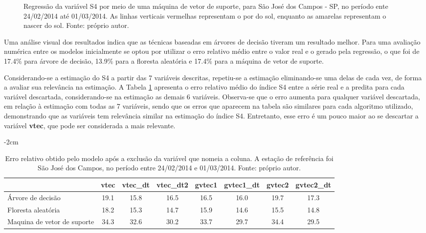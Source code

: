 \begin{figure}
\centering
{}
\caption{Regressão da variável S4 por meio de uma máquina de vetor de suporte, para São José dos Campos - SP, no período ente 24/02/2014 até 01/03/2014. As linhas verticais vermelhas representam o por do sol, enquanto as amarelas representam o nascer do sol. Fonte: próprio autor.}
\label{fig:regressionsvm}
\end{figure}

Uma análise visual dos resultados indica que as técnicas baseadas em árvores de decisão tiveram um resultado melhor. Para uma avaliação numérica entre os modelos inicialmente se optou por utilizar o erro relativo médio entre o valor real e o gerado pela regressão, o que foi de 17.4\% para árvore de decisão, 13.9\% para a floresta aleatória e 17.4\% para a máquina de vetor de suporte.

Considerando-se a estimação do S4 a partir das  7 variáveis descritas, repetiu-se a estimação eliminando-se uma delas de cada vez, de forma a avaliar sua relevância na estimação. A Tabela \ref{tab:relativeerror} apresenta o erro relativo médio do índice S4 entre a série real e a predita para cada variável descartada, considerando-se na estimação as demais 6 variáveis. Observa-se que o erro aumenta para qualquer variável descartada, em relação à estimação com todas as 7 variáveis, sendo que os erros que aparecem na tabela são similares para cada algoritmo utilizado, demonstrando que as variáveis tem relevância similar na estimação do índice S4. Entretanto, esse erro é um pouco maior ao se descartar a variável {\bf vtec}, que pode ser considerada a mais relevante.

\begin{table}
\addtolength{\leftskip} {-2cm} %
\addtolength{\rightskip}{-2cm}
\small
\begin{tabular}{|l|c|c|c|c|c|c|c|}
\hline
&  {\bf vtec} &  {\bf vtec\_dt} &  {\bf vtec\_dt2} &  {\bf gvtec1} &  {\bf gvtec1\_dt} &  {\bf gvtec2} &  {\bf gvtec2\_dt} \\ \hline
Árvore de decisão & 19.1 & 15.8 & 16.5 & 16.5 & 16.0 & 19.7 & 17.3 \\ \hline
Floresta aleatória & 18.2 & 15.3 & 14.7 & 15.9 & 14.6 & 15.5 & 14.8 \\ \hline
Maquina de vetor de suporte & 34.3 & 32.6 & 30.2 & 33.7 & 29.7 & 34.4 & 29.5 \\ \hline
\end{tabular}
\vspace{12pt}
\caption{Erro relativo obtido pelo modelo após a exclusão da variável que nomeia a coluna. A estação de referência foi São José dos Campos, no período entre 24/02/2014 e 01/03/2014. Fonte: próprio autor.}
\label{tab:relativeerror}
\end{table}

